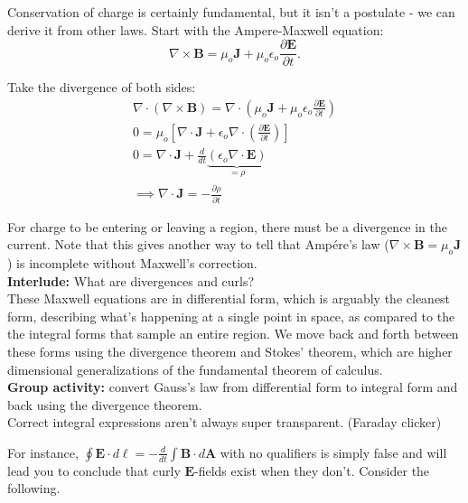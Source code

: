 \documentclass{article}
\numberwithin{equation}{section}
\begin{document}
Conservation of charge is certainly fundamental, but it isn't a postulate - we can derive it from other laws. Start with the Ampere-Maxwell equation:
\begin{equation*}
    \nabla \times \bm{B} = \mu_o \bm{J} + \mu_o \epsilon_o \frac{\partial \bm{E}}{\partial t}.
\end{equation*}

Take the divergence of both sides:
\begin{gather*}
    \nabla \cdot \left( \nabla \times \bm{B} \right) = \nabla \cdot \left( \mu_o \bm{J} + \mu_o \epsilon_o \frac{\partial \bm{E}}{\partial t} \right) \\
    0 = \mu_o \left[ \nabla \cdot \bm{J} + \epsilon_o \nabla \cdot \left( \frac{\partial \bm{E}}{\partial t} \right) \right] \\
    0 = \nabla \cdot \bm{J} + \frac{d}{dt} \underbrace{\left( \epsilon_o \nabla \cdot \bm{E} \right)}_{\displaystyle = \rho} \\
    \implies \boxed{\nabla \cdot \bm{J} = -\frac{\partial \rho}{\partial t}}
\end{gather*}

For charge to be entering or leaving a region, there must be a divergence in the current. Note that this gives another way to tell that Amp{\'e}re's law ($\displaystyle \nabla \times \bm{B} = \mu_o \bm{J}$) is incomplete without Maxwell's correction. \\

\textbf{Interlude:} What are divergences and curls? \\

These Maxwell equations are in differential form, which is arguably the cleanest form, describing what's happening at a single point in space, as compared to the the integral forms that sample an entire region. We move back and forth between these forms using the divergence theorem and Stokes' theorem, which are higher dimensional generalizations of the fundamental theorem of calculus. \\

\textbf{Group activity:} convert Gauss's law from differential form to integral form and back using the divergence theorem. \\

Correct integral expressions aren't always super transparent. (Faraday clicker) 

For instance, $\displaystyle \oint \bm{E} \cdot d\bm{\ell} = -\frac{d}{dt} \int \bm{B} \cdot d\bm{A}$ with no qualifiers is simply false and will lead you to conclude that curly $\bm{E}$-fields exist when they don't. Consider the following.
\end{document}
